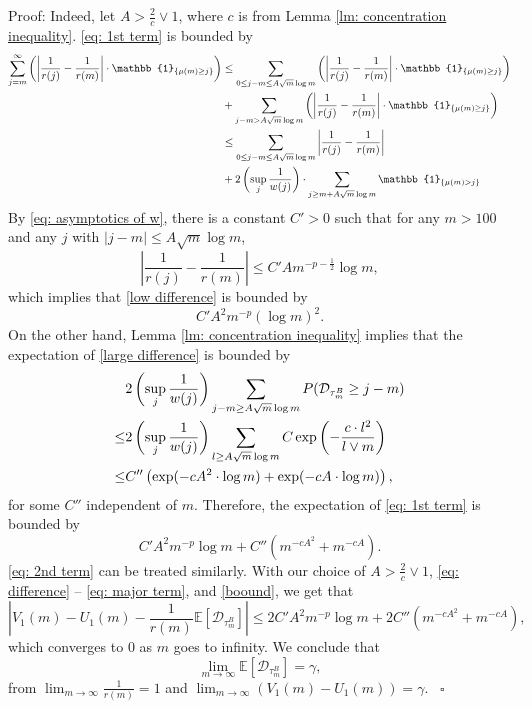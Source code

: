 \documentclass[twoside,12pt,a4paper]{article}
\numberwithin{equation}{section}
\newenvironment{proof}[1][Proof]{{\sc #1}:}{~\hfill $\square$}
\newcommand{\abs}[1]{\left\vert #1 \right\vert}
\begin{document}
\begin{proof}
			Indeed, let $A> \frac{2}{c} \vee 1$, where $c$ is from Lemma \ref{lm: concentration inequality}. \eqref{eq: 1st term} is bounded by
			\begin{align}
				\sum_{j=m}^{\infty} \left(\abs{\frac{1}{r(j)} -\frac{1}{r(m)} } \cdot \mathbb{1}_{\{\mu(m)\geq j \}}\right) & \leq  \sum_{0\leq j-m \leq A \sqrt{m}\log m } \left(\abs{\frac{1}{r(j)} -\frac{1}{r(m)} } \cdot \mathbb{1}_{\{\mu(m)\geq j \}}\right) 
				\notag
				\\
				& +  \sum_{j-m > A\sqrt{m}\log m } \left(\abs{\frac{1}{r(j)} -\frac{1}{r(m)} } \cdot \mathbb{1}_{\{\mu(m)\geq j \}}\right)
				\notag
				\\
				&\leq  \sum_{0\leq j-m \leq A\sqrt{m}\log m } \abs{\frac{1}{r(j)} -\frac{1}{r(m)} }
				\label{low difference}
				\\
				& + 2\left(\sup_j \frac{1}{w(j)}\right) \cdot \sum_{j\geq m + A\sqrt{m}\log m } \mathbb{1}_{\{ \mu(m) > j \}}
				\label{large difference}
			\end{align}
		 By \eqref{eq: asymptotics of w}, there is a constant $C'>0$ such that for any $m>100 $ and any $j$ with $\abs{j-m}\leq A \sqrt m \log m $, 
			$$ \abs{\frac{1}{r(j)} -\frac{1}{r(m)} } \leq C' A m^{-p-\frac{1}{2}} \log m, $$
			which implies that \eqref{low difference} is bounded by
			$$
			C' A^2 m^{-p} (\log m)^2.
			$$ On the other hand, Lemma \ref{lm: concentration inequality} implies that the expectation of \eqref{large difference} is bounded by
			\begin{align*}
				& 2\left(\sup_j \frac{1}{w(j)}\right) \sum_{j-m \geq A \sqrt m \log m  } P( \mathcal{D}_{\tau^B_m} \geq j-m )  
				\notag 
				\\
				\leq& 2\left(\sup_j \frac{1}{w(j)}\right) \sum_{l \geq A \sqrt m \log m } C \exp\left( - \frac{c  \cdot l^2}{l \vee m}   \right)
				\notag\\
				\leq& C'' \left( \exp (- cA^2 \cdot \log m ) + \exp(-cA \cdot \log m) \right), 
			\end{align*} for some $C''$ independent of $m$. Therefore, the expectation of \eqref{eq: 1st term} is bounded by
			\begin{equation}\label{boound}
				C' A^2 m^{-p} \log m + C''  \left( m ^{-cA^2} +  m^{-cA} \right). 
			\end{equation}
			\eqref{eq: 2nd term} can be treated similarly. With our choice of $A >\frac{2}{c} \vee 1$,
			\eqref{eq: difference} -- 
			\eqref{eq: major term}, and \eqref{boound}, we get that
			$$ \abs{ V_1(m)- U_1(m) -\frac{1}{r(m)}\mathbb{E}\left[ \mathcal{D}_{\tau^B_m} \right] }
			\leq 2C' A^2 m^{-p} \log m + 2C''  \left( m ^{-cA^2} +  m^{-cA} \right), 
			$$ which converges to $0$ as $m$ goes to infinity. We conclude that 
			$$
			\lim_{m\to\infty}\mathbb{E}\left[ \mathcal{D}_{\tau^B_m} \right] = \gamma, 
			$$ from $\lim_{m\to\infty}\frac{1}{r(m)} =1$ and $ \lim_{m\to \infty} \left(V_1(m)-U_1(m) \right) = \gamma$.
		\end{proof}
\end{document}
